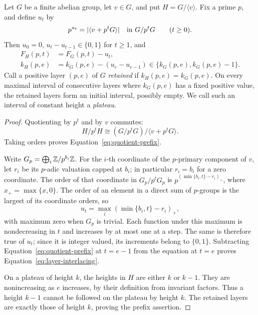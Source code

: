 \begin{lemma}\label{lem:layer-quotient}
Let \(G\) be a finite abelian group, let \(v\in G\), and put
\(H=G/\langle v\rangle\). Fix a prime \(p\), and define \(u_t\) by
\[
 p^{u_t}=|\langle v+p^tG\rangle|\quad\hbox{in }G/p^tG
 \qquad(t\ge0).
\]
Then \(u_0=0\), \(u_t-u_{t-1}\in\{0,1\}\) for \(t\ge1\), and
\begin{align}
 F_H(p,t)&=F_G(p,t)-u_t,\label{eq:quotient-prefix}\\
 k_H(p,e)&=k_G(p,e)-(u_e-u_{e-1})\in
           \{k_G(p,e),k_G(p,e)-1\}.\label{eq:layer-interlacing}
\end{align}
Call a positive layer \((p,e)\) of \(G\) \emph{retained} if
\(k_H(p,e)=k_G(p,e)\). On every maximal interval of consecutive
layers where \(k_G(p,e)\) has a fixed positive value, the retained
layers form an initial interval, possibly empty. We call such an
interval of constant height a \emph{plateau}.
\end{lemma}

\begin{proof}
Quotienting by \(p^t\) and by \(v\) commutes:
\[
 H/p^tH\cong (G/p^tG)/\langle v+p^tG\rangle.
\]
Taking orders proves Equation~\eqref{eq:quotient-prefix}.

Write \(G_p=\bigoplus_i\mathbb Z/p^{b_i}\mathbb Z\). For the \(i\)-th coordinate
of the \(p\)-primary component of \(v\), let \(r_i\) be its
\(p\)-adic valuation capped at \(b_i\); in particular \(r_i=b_i\)
for a zero coordinate. The order of that coordinate in
\(G_p/p^tG_p\) is \(p^{(\min\{b_i,t\}-r_i)_+}\), where
\(x_+=\max\{x,0\}\). The order of an element in a direct sum of
\(p\)-groups is the largest of its coordinate orders, so
\begin{equation}\label{eq:quotient-order-exponent}
 u_t=\max_i(\min\{b_i,t\}-r_i)_+,
\end{equation}
with maximum zero when \(G_p\) is trivial. Each function under this
maximum is nondecreasing in \(t\) and increases by at most one at a
step. The same is therefore true of \(u_t\); since it is integer
valued, its increments belong to \(\{0,1\}\). Subtracting
Equation~\eqref{eq:quotient-prefix} at \(t=e-1\) from the equation at
\(t=e\) proves Equation~\eqref{eq:layer-interlacing}.

On a plateau of height \(k\), the heights in \(H\) are either \(k\)
or \(k-1\). They are nonincreasing as \(e\) increases, by their
definition from invariant factors. Thus a height \(k-1\) cannot be
followed on the plateau by height \(k\). The retained layers are
exactly those of height \(k\), proving the prefix assertion.
\end{proof}

